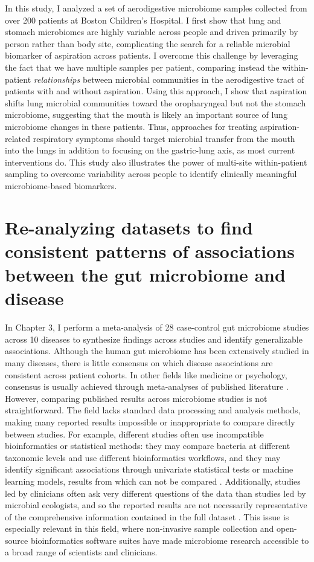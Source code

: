 In this study, I analyzed a set of aerodigestive microbiome samples collected from over 200 patients at Boston Children's Hospital.
I first show that lung and stomach microbiomes are highly variable across people and driven primarily by person rather than body site, complicating the search for a reliable microbial biomarker of aspiration across patients.
I overcome this challenge by leveraging the fact that we have multiple samples per patient, comparing instead the within-patient \textit{relationships} between microbial communities in the aerodigestive tract of patients with and without aspiration.
Using this approach, I show that aspiration shifts lung microbial communities toward the oropharyngeal but not the stomach microbiome, suggesting that the mouth is likely an important source of lung microbiome changes in these patients.
Thus, approaches for treating aspiration-related respiratory symptoms should target microbial transfer from the mouth into the lungs in addition to focusing on the gastric-lung axis, as most current interventions do.
This study also illustrates the power of multi-site within-patient sampling to overcome variability across people to identify clinically meaningful microbiome-based biomarkers.

\section{Re-analyzing datasets to find consistent patterns of associations between the gut microbiome and disease}

In Chapter 3, I perform a meta-analysis of 28 case-control gut microbiome studies across 10 diseases to synthesize findings across studies and identify generalizable associations.
Although the human gut microbiome has been extensively studied in many diseases, there is little consensus on which disease associations are consistent across patient cohorts.
In other fields like medicine or psychology, consensus is usually achieved through meta-analyses of published literature \cite{glass-1976}.
However, comparing published results across microbiome studies is not straightforward.
The field lacks standard data processing and analysis methods, making many reported results impossible or inappropriate to compare directly between studies.
For example, different studies often use incompatible bioinformatics or statistical methods: they may compare bacteria at different taxonomic levels and use different bioinformatics workflows, and they may identify significant associations through univariate statistical tests or machine learning models, results from which can not be compared \cite{edd-singh,crc-baxter,crc-zeller,ob-zupancic}.
Additionally, studies led by clinicians often ask very different questions of the data than studies led by microbial ecologists, and so the reported results are not necessarily representative of the comprehensive information contained in the full dataset \cite{asd-son,ra-scher,nash-wong}.
This issue is especially relevant in this field, where non-invasive sample collection and open-source bioinformatics software suites have made microbiome research accessible to a broad range of scientists and clinicians.

